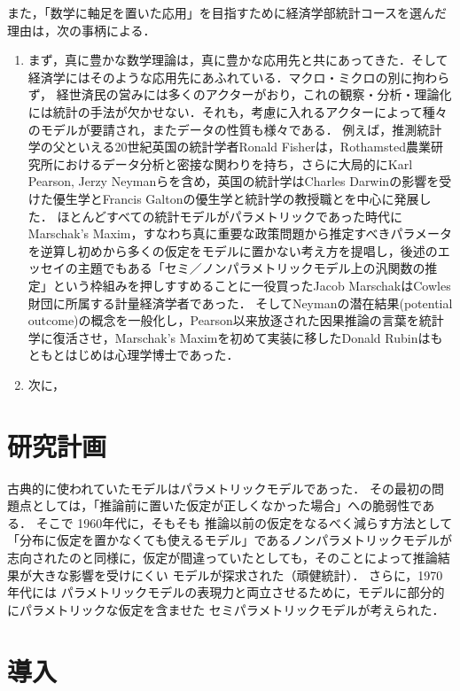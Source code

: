 \documentclass[uplatex, dvipdfmx]{jsarticle}
\begin{document}
また，「数学に軸足を置いた応用」を目指すために経済学部統計コースを選んだ理由は，次の事柄による．
\begin{enumerate}
    \item まず，真に豊かな数学理論は，真に豊かな応用先と共にあってきた．そして経済学にはそのような応用先にあふれている．マクロ・ミクロの別に拘わらず，
    経世済民の営みには多くのアクターがおり，これの観察・分析・理論化には統計の手法が欠かせない．それも，考慮に入れるアクターによって種々のモデルが要請され，またデータの性質も様々である．
    例えば，推測統計学の父といえる20世紀英国の統計学者Ronald Fisherは，Rothamsted農業研究所におけるデータ分析と密接な関わりを持ち，さらに大局的にKarl Pearson, Jerzy Neymanらを含め，英国の統計学はCharles Darwinの影響を受けた優生学とFrancis Galtonの優生学と統計学の教授職とを中心に発展した\cite{Fisher}．
    ほとんどすべての統計モデルがパラメトリックであった時代にMarschak's Maxim，すなわち真に重要な政策問題から推定すべきパラメータを逆算し初めから多くの仮定をモデルに置かない考え方を提唱し，後述のエッセイの主題でもある「セミ／ノンパラメトリックモデル上の汎関数の推定」という枠組みを押しすすめることに一役買ったJacob MarschakはCowles財団に所属する計量経済学者であった\cite{van der Laan}．
    そしてNeymanの潜在結果(potential outcome)の概念を一般化し，Pearson以来放逐された因果推論の言葉を統計学に復活させ，Marschak's Maximを初めて実装に移したDonald Rubinはもともとはじめは心理学博士であった．
    \item 次に，
\end{enumerate}


\section*{研究計画}

古典的に使われていたモデルはパラメトリックモデルであった．
その最初の問題点としては，「推論前に置いた仮定が正しくなかった場合」への脆弱性である．
そこで
1960年代に，そもそも
推論以前の仮定をなるべく減らす方法として
「分布に仮定を置かなくても使えるモデル」であるノンパラメトリックモデルが志向されたのと同様に，仮定が間違っていたとしても，そのことによって推論結果が大きな影響を受けにくい
モデルが探求された（頑健統計）．
さらに，1970年代には
パラメトリックモデルの表現力と両立させるために，モデルに部分的にパラメトリックな仮定を含ませた
セミパラメトリックモデルが考えられた．



\tableofcontents

\section{導入}
\end{document}
